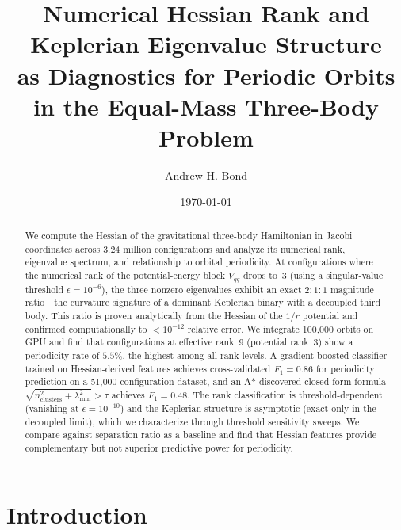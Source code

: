 \documentclass[aps,pre,twocolumn,superscriptaddress,floatfix]{revtex4-2}
\begin{document}
\title{Numerical Hessian Rank and Keplerian Eigenvalue Structure\\as Diagnostics for Periodic Orbits in the Equal-Mass Three-Body Problem}

\author{Andrew H. Bond}

\date{\today}

\begin{abstract}
We compute the Hessian of the gravitational three-body Hamiltonian in
Jacobi coordinates across 3.24 million configurations and analyze its
numerical rank, eigenvalue spectrum, and relationship to orbital
periodicity. At configurations where the numerical rank of the
potential-energy block $V_{qq}$ drops to~3 (using a singular-value
threshold $\epsilon = 10^{-6}$), the three nonzero eigenvalues
exhibit an exact $2{:}1{:}1$ magnitude ratio---the curvature signature
of a dominant Keplerian binary with a decoupled third body. This ratio
is proven analytically from the Hessian of the $1/r$ potential and
confirmed computationally to $< 10^{-12}$ relative error. We integrate
100{,}000 orbits on GPU and find that configurations at effective
rank~9 (potential rank~3) show a periodicity rate of $5.5\%$,
the highest among all rank levels.
A gradient-boosted classifier trained on Hessian-derived features
achieves cross-validated $F_1 = 0.86$ for periodicity prediction on
a 51{,}000-configuration dataset, and an A*-discovered closed-form
formula $\sqrt{n_\mathrm{clusters}^2 + \lambda_\mathrm{min}^2} > \tau$
achieves $F_1 = 0.48$. The rank classification is threshold-dependent
(vanishing at $\epsilon = 10^{-10}$) and the Keplerian structure
is asymptotic (exact only in the decoupled limit), which we
characterize through threshold sensitivity sweeps. We compare against
separation ratio as a baseline and find that Hessian features provide
complementary but not superior predictive power for periodicity.
\end{abstract}

\maketitle

\section{Introduction}
\end{document}
